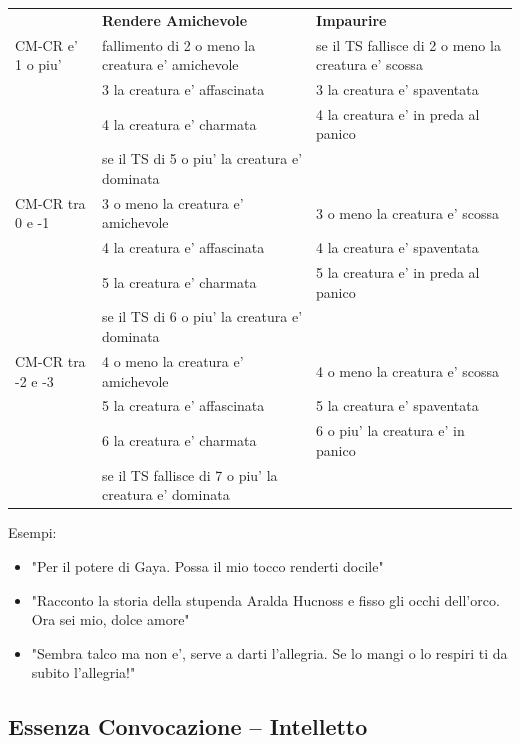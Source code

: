 \documentclass[a4paper,11pt,twoside,openany]{book}
\begin{document}
\begin{tabular}{L{2.5cm} L{7cm} L{7cm}}
\toprule
 & \textbf{Rendere Amichevole} & \textbf{Impaurire}\tabularnewline
CM-CR e' 1 o piu' & fallimento di 2 o meno la creatura e' amichevole & se il TS fallisce di 2 o meno la creatura e' scossa\tabularnewline
& 3 la creatura e' affascinata & 3 la creatura e' spaventata\tabularnewline
& 4 la creatura e' charmata & 4 la creatura e' in preda al panico\tabularnewline
& se il TS di 5 o piu' la creatura e' dominata & \tabularnewline
CM-CR tra 0 e -1 & 3 o meno la creatura e' amichevole & 3 o meno la creatura e' scossa\tabularnewline
& 4 la creatura e' affascinata & 4 la creatura e' spaventata\tabularnewline
& 5 la creatura e' charmata & 5 la creatura e' in preda al panico\tabularnewline
& se il TS di 6 o piu' la creatura e' dominata & \tabularnewline
CM-CR tra -2 e -3 & 4 o meno la creatura e' amichevole & 4 o meno la creatura e' scossa\tabularnewline
 & 5 la creatura e' affascinata & 5 la creatura e' spaventata\tabularnewline
 & 6 la creatura e' charmata & 6 o piu' la creatura e' in panico\tabularnewline
 & se il TS fallisce di 7 o piu' la creatura e' dominata & \tabularnewline
\end{tabular}


\bigskip

Esempi:
\begin{itemize}
\item 
"Per il potere di Gaya. Possa il mio tocco renderti docile" 
\item 
"Racconto la storia della stupenda Aralda Hucnoss e fisso gli occhi dell'orco. Ora sei mio, dolce amore" 
\item 
"Sembra talco ma non e', serve a darti l'allegria. Se lo mangi o lo respiri ti da subito l'allegria!" 
\end{itemize}

\pagebreak

\subsection{Essenza Convocazione -- Intelletto}


\label{essenza-convocazione---intelletto}
\end{document}

